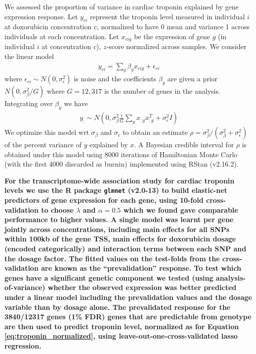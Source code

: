 \documentclass{article}
\newcommand{\tempbold}[1]{\textbf{#1}}
\begin{document}
We assessed the proportion of variance in cardiac troponin explained by gene expression response. Let $y_{ci}$ represent the troponin level measured in individual $i$ at doxorubicin concentration $c$, normalized to have 0 mean and variance 1 across individuals at each concentration. Let $x_{cig}$ be the expression of gene $g$ (in individual $i$ at concentration $c$), $z$-score normalized across samples. We consider the linear model 
\begin{align}
y_{ci} = \sum_g \beta_g x_{cig} + \epsilon_{ci} \label{eq:troponin_normalized}
\end{align}
where $\epsilon_{ci} \sim N(0,\sigma_\epsilon^2)$ is noise and the coefficients $\beta_g$ are given a prior $N(0, \sigma_\beta^2 / G )$ where $G=12,317$ is the number of genes in the analysis. Integrating over $\beta_g$ we have 
\begin{align}
y_{:} \sim N\left(0 , \sigma_\beta^2 \frac{1}{G} \sum_g x_{:g} x_{:g}^T + \sigma_\epsilon^2 I \right)
\end{align}
We optimize this model wrt $\sigma_\beta$ and $\sigma_\epsilon$ to obtain an estimate $\rho = \sigma_\beta^2 / (\sigma_\beta^2 + \sigma_\epsilon^2)$ of the percent variance of $y$ explained by $x$. A Bayesian credible interval for $\rho$ is obtained under this model using 8000 iterations of Hamiltonian Monte Carlo (with the first 4000 discarded as burnin) implemented using RStan\cite{carpenter2016stan} (v2.16.2). 

\tempbold{For the transcriptome-wide association study for cardiac troponin levels we use the R package \texttt{glmnet} (v2.0-13) to build elastic-net predictors of gene expression for each gene, using 10-fold cross-validation to choose $\lambda$ and $\alpha=0.5$ which we found gave comparable performance to higher values. A single model was learnt per gene jointly across concentrations, including main effects for all SNPs within 100kb of the gene TSS, main effects for doxorubicin dosage (encoded categorically) and interaction terms between each SNP and the dosage factor. The fitted values on the test-folds from the cross-validation are known as the ``prevalidation'' response. To test which genes have a significant genetic component we tested (using analysis-of-variance) whether the observed expression was better predicted under a linear model including the prevalidation values and the dosage variable than by dosage alone. The prevalidated response for the 3840/12317 genes (1\% FDR) genes that are predictable from genotype are then used to predict troponin level, normalized as for Equation \ref{eq:troponin_normalized}, using leave-out-one-cross-validated lasso regression.} 
\end{document}
